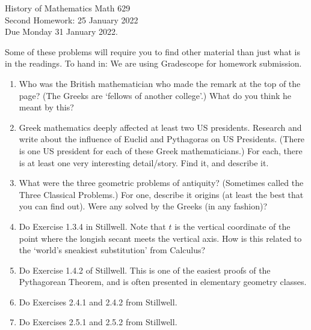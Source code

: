 \documentclass[12pt]{article}
\begin{document}
\LARGE 
\noindent
{\color{Maroon}History of Mathematics \hfill Math 629}\vspace{2pt}\\
\large
Second Homework: \hfill 25 January 2022\\
Due Monday 31 January 2022.
\normalsize\vspace{10pt}

      Some of these problems will require you to find other material than just what is in the readings.
To hand in: We are using Gradescope for homework submission.


\begin{enumerate}

\item    Who was the British mathematician who made the remark at the top of the page?
  (The Greeks are `fellows of another college'.)
  What do you think he meant by this?


\item     Greek mathematics deeply affected at least two US presidents. Research and write about the influence of Euclid and Pythagoras on
  US Presidents. (There is one US president for each of these Greek mathematicians.)
  For each, there is at least one very interesting
  detail/story. Find it, and describe it. 


\item     What were the three geometric problems of antiquity? (Sometimes called the Three Classical Problems.)
  For one, describe it origins (at least the best that you can find out). Were any solved by the Greeks (in any fashion)?


\item     Do Exercise 1.3.4 in Stillwell. Note that $t$ is the vertical coordinate of the point where the longish secant meets the vertical
  axis. How is this related to the `world's sneakiest substitution' from Calculus? 


\item     Do Exercise 1.4.2 of Stillwell.
  This is one of the easiest proofs of the Pythagorean Theorem, and is often presented in elementary geometry classes.


\item     Do Exercises 2.4.1 and 2.4.2 from Stillwell.


\item     Do Exercises 2.5.1 and 2.5.2 from Stillwell.
       
\end{enumerate}
\end{document}
